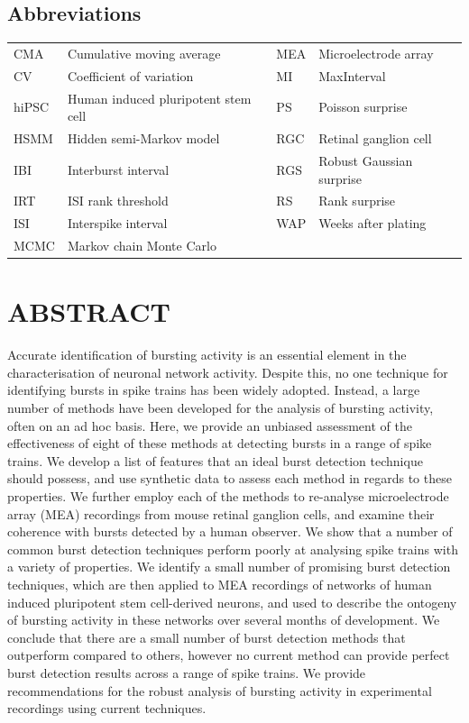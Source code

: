 \documentclass[12pt, titlepage]{article}
\begin{document}
	\subsection*{Abbreviations}
	\begin{tabular}{llll}
		\hline
		CMA & Cumulative moving average & MEA & Microelectrode array 
		\\CV & Coefficient of variation &  	MI & MaxInterval
		\\hiPSC & Human induced pluripotent stem cell & PS &  Poisson surprise								 
		\\HSMM &  Hidden semi-Markov model \ \ \ &  RGC & Retinal ganglion cell
		\\ IBI &  Interburst interval& RGS & Robust Gaussian surprise
		\\IRT & ISI rank threshold &	RS & Rank surprise
		\\ ISI & Interspike interval & WAP & Weeks after plating
		\\ MCMC & Markov chain Monte Carlo
		\\ \hline
	\end{tabular}
	\section*{ABSTRACT}
	Accurate identification of bursting activity is an essential element in the characterisation of neuronal network activity. Despite this, no one technique for identifying bursts in spike trains has been widely adopted. Instead, a large number of methods have been developed for the analysis of bursting activity, often on an ad hoc basis. Here, we provide an unbiased assessment of the effectiveness of eight of these methods at detecting bursts in a range of spike trains. We develop a list of features that an ideal burst detection technique should possess, and use synthetic data to assess each method in regards to these properties. We further employ each of the methods to re-analyse microelectrode array (MEA) recordings from mouse retinal ganglion cells, and examine their coherence with bursts detected by a human observer. We show that a number of common burst detection techniques perform poorly at analysing spike trains with a variety of properties. We identify a small number of promising burst detection techniques, which are then applied to MEA recordings of networks of human induced pluripotent stem cell-derived neurons, and used to describe the ontogeny of bursting activity in these networks over several months of development. We conclude that there are a small number of burst detection methods that outperform compared to others, however no current method can provide perfect burst detection results across a range of spike trains. We provide recommendations for the robust analysis of bursting activity in experimental recordings using current techniques.
\end{document}
